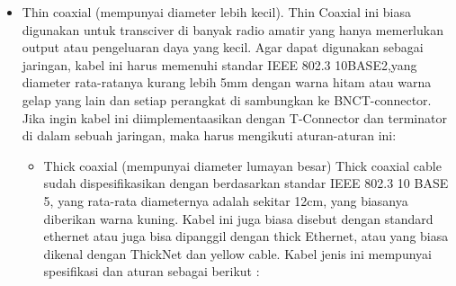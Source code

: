 \begin{itemize}
{\begin{itemize}
		\item Thin coaxial (mempunyai diameter lebih kecil). Thin Coaxial ini biasa digunakan untuk transciver di banyak radio amatir yang hanya memerlukan output atau pengeluaran daya yang kecil. Agar dapat digunakan sebagai jaringan, kabel ini harus memenuhi standar IEEE 802.3 10BASE2,yang diameter rata-ratanya kurang lebih 5mm dengan warna hitam atau warna gelap yang lain dan setiap perangkat di sambungkan ke BNCT-connector. Jika ingin kabel ini diimplementaasikan dengan T-Connector dan terminator di dalam sebuah jaringan, maka harus mengikuti aturan-aturan ini: 
			
	\begin{itemize}
		\item Thick coaxial (mempunyai diameter lumayan besar) Thick coaxial cable sudah dispesifikasikan dengan berdasarkan standar IEEE 802.3 10 BASE 5, yang rata-rata diameternya adalah sekitar 12cm, yang biasanya diberikan warna kuning. Kabel ini juga biasa disebut dengan standard ethernet atau juga bisa dipanggil dengan thick Ethernet, atau yang biasa dikenal dengan ThickNet dan yellow cable. Kabel jenis ini mempunyai spesifikasi dan aturan sebagai berikut :


\end{itemize}
\end{itemize}}
\end{itemize}
